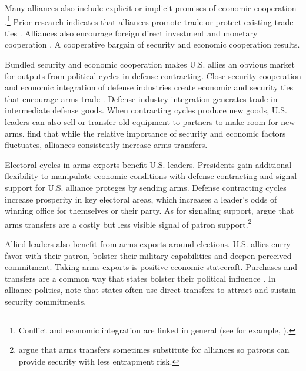 \documentclass[12pt]{article}
\begin{document}
Many alliances also include explicit or implicit promises of economic cooperation \citep{GowaMansfield2004, LongLeeds2006, Davis2008, Poast2012}.\footnote{Conflict and economic integration are linked in general (see for example, \citep{GartzkeLi2003, Chen2021}).}
Prior research indicates that alliances promote trade \citep{Gowa1995, GowaMansfield2004, Haim2016} or protect existing trade ties \citep{Fordham2010}.
Alliances also encourage foreign direct investment \citep{LiVashchilko2010} and monetary cooperation \citep{Li2003}.
A cooperative bargain of security and economic cooperation results. 


Bundled security and economic cooperation makes U.S. allies an obvious market for outputs from political cycles in defense contracting.
Close security cooperation and economic integration of defense industries create economic and security ties that encourage arms trade \citep{Bitzinger1994}. 
Defense industry integration generates trade in intermediate defense goods. 
When contracting cycles produce new goods, U.S. leaders can also sell or transfer old equipment to partners to make room for new arms.
\citet{Thurneretal2019} find that while the relative importance of security and economic factors fluctuates, alliances consistently increase arms transfers.


Electoral cycles in arms exports benefit U.S. leaders.
Presidents gain additional flexibility to manipulate economic conditions with defense contracting and signal support for U.S. alliance proteges by sending arms.
Defense contracting cycles increase prosperity in key electoral areas, which increases a leader's odds of winning office for themselves or their party. 
As for signaling support, \citet{McManusYarhi-Milo2017} argue that arms transfers are a costly but less visible signal of patron support.\footnote{\citet{Yarhi-Miloetal2016} argue that arms transfers sometimes substitute for alliances so patrons can provide security with less entrapment risk.}


Allied leaders also benefit from arms exports around elections.
U.S. allies curry favor with their patron, bolster their military capabilities and deepen perceived commitment.
Taking arms exports is positive economic statecraft. 
Purchases and transfers are a common way that states bolster their political influence \citep[pg. 42-3]{Baldwin2020}.
In alliance politics, \citet[pg. 184-5]{IkenberryGrieco2003} note that states often use direct transfers to attract and sustain security commitments.  
\end{document}
